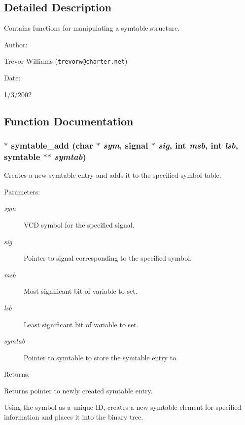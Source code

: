 \subsection{Detailed Description}
Contains functions for manipulating a symtable structure.



\begin{Desc}
\item[Author: ]\par
Trevor Williams ({\tt trevorw@charter.net}) \end{Desc}
\begin{Desc}
\item[Date: ]\par
1/3/2002\end{Desc}


\subsection{Function Documentation}
\subsubsection{$\ast$ symtable\_\-add (char $\ast$ {\em sym}, {\bf signal} $\ast$ {\em sig}, int {\em msb}, int {\em lsb}, {\bf symtable} $\ast$$\ast$ {\em symtab})}\label{symtable_8h_a0}


Creates a new symtable entry and adds it to the specified symbol table.

\begin{Desc}
\item[Parameters: ]\par
\begin{description}
\item[{\em 
sym}]VCD symbol for the specified signal. \item[{\em 
sig}]Pointer to signal corresponding to the specified symbol. \item[{\em 
msb}]Most significant bit of variable to set. \item[{\em 
lsb}]Least significant bit of variable to set. \item[{\em 
symtab}]Pointer to symtable to store the symtable entry to.\end{description}
\end{Desc}
\begin{Desc}
\item[Returns: ]\par
Returns pointer to newly created symtable entry.\end{Desc}
Using the symbol as a unique ID, creates a new symtable element for specified information and places it into the binary tree. 
